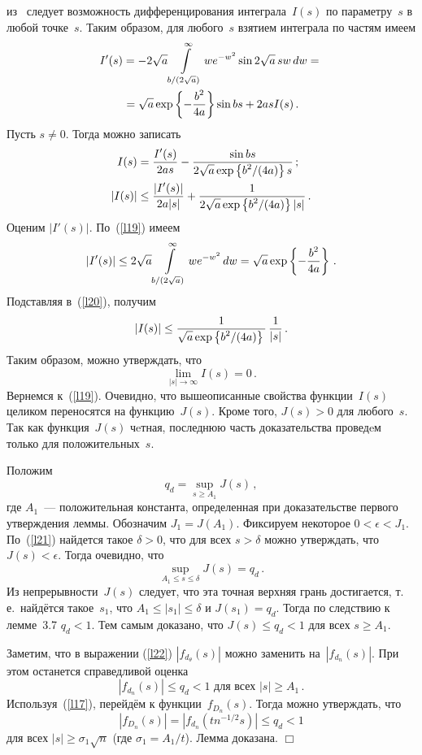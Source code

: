 \begin{multicols}{2}
из~\cite{matan} следует возможность дифференцирования интеграла~$I(s)$ по параметру~$s$ в любой точке~$s$. 
Таким образом, для любого~$s$ взятием интеграла по частям имеем
\begin{multline}
I'(s) = -2\sqrt{a}\int\limits_{{b}/(2\sqrt{a})}^{\infty} we^{-w^2} \sin 2\sqrt{a}\,sw\,dw ={}\\
{}= \sqrt{a} \exp\left\{-\displaystyle\frac{\displaystyle b^2\mathstrut}{\displaystyle 4a\mathstrut}\right\} \sin bs + 2asI(s)\,.
\label{l19}
\end{multline}
Пусть $s \ne 0$. Тогда можно записать
\begin{align}
I(s) &= \displaystyle\frac{\displaystyle I'(s)\mathstrut}{\displaystyle 2as\mathstrut} - \displaystyle\frac{\displaystyle \sin bs\mathstrut}{\displaystyle 2\sqrt{a}\exp\left\{{b^2}/(4a)\right\} s\mathstrut}\,;\notag\\
|I(s)| &\leq \displaystyle\frac{\displaystyle |I'(s)|\mathstrut}{\displaystyle 2a|s|\mathstrut} + \displaystyle\frac{\displaystyle 1\mathstrut}{\displaystyle 2\sqrt{a}\exp\left\{{b^2}/(4a)\right\}|s|\mathstrut}\,.
\label{l20}
\end{align}
Оценим $|I'(s)|$. По~(\ref{l19}) имеем
$$
\left|I'(s)\right| \leq 2\sqrt{a}\int\limits_{{b}/(2\sqrt{a})}^{\infty} we^{-w^2}\,dw = 
\sqrt{a} \exp\left\{-\displaystyle\frac{\displaystyle b^2\mathstrut}{\displaystyle 4a\mathstrut}\right\}\,.
$$
Подставляя в~(\ref{l20}), получим
$$
\left|I(s)\right| \leq \displaystyle\frac{\displaystyle 1\mathstrut}{\displaystyle \sqrt{a} \exp\left\{{b^2}/(4a)\right\}\mathstrut} \, \displaystyle\frac{\displaystyle 1\mathstrut}{\displaystyle |s|\mathstrut}\,.
$$
Таким образом, можно утверждать, что
\begin{equation}
\lim_{|s|\to\infty} I(s) = 0\,.
\label{l21}
\end{equation}
Вернемся к~(\ref{l19}). Очевидно, что вышеописанные свойства функции~$I(s)$ целиком переносятся на функцию~$J(s)$. 
Кроме того, $J(s) > 0$ для любого~$s$. Так как функция~$J(s)$ чeтная, последнюю часть доказательства 
проведeм только для положительных~$s$.

Положим
$$
q_d = \sup\limits_{s \geq A_1} J(s)\,,
$$
где $A_1$~--- положительная константа, определенная при доказательстве первого утверждения леммы. 
Обозначим $J_1 = J(A_1)$. Фиксируем некоторое $0< \epsilon < J_1$. По~(\ref{l21}) найдется такое $\delta>0$, 
что для всех $s>\delta$ можно утверждать, что $J(s)<\epsilon$. Тогда очевидно, что
$$
\sup\limits_{A_1 \leq s \leq \delta} J(s) = q_d\,.
$$
Из непрерывности~$J(s)$ следует, что эта точная верхняя грань
достигается, т.\,е.\ найдётся такое~$s_1$, что $A_1 \leq |s_1| \leq
\delta$ и $J(s_1) = q_d$. Тогда по следствию к лемме~3.7
$q_d < 1$. Тем самым доказано, что $J(s) \leq q_d < 1$ для всех $s
\geq A_1$.

Заметим, что в выражении (\ref{l22}) $|f_{d_{\theta}}(s)|$ можно заменить на~$|f_{d_n}(s)|$. 
При этом останется справедливой оценка
$$
|f_{d_n}(s)| \leq q_d < 1 \mbox{ для всех } |s| \geq A_1\,.
$$
Используя~(\ref{l17}), перейдём к функции~$f_{D_n}(s)$. Тогда можно
утверждать, что
$$
|f_{D_n}(s)| = |f_{d_n}(tn^{-1/2}s)| \leq q_d < 1
$$
для всех $|s| \geq \sigma_1 \sqrt{n}$  (где $\sigma_1 = A_1/t$). Лемма доказана.
\hfill $\Box$


\end{multicols}

